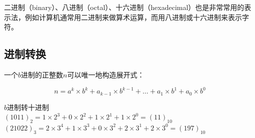 \documentclass[12pt, openany, oneside]{book}
\begin{document}
二进制（binary）、八进制（octal）、十六进制（hexadecimal）也是非常常用的表示法，例如计算机通常用二进制来做算术运算，而用八进制或十六进制来表示字符。\\

\subsection{进制转换}

一个$ b $进制的正整数$ n $可以唯一地构造展开式：

\vspace{-0.5cm}

$$
	n = a^k \times b^k + a_{k-1} \times b^{k-1} + \dots + a_1 \times b^1 + a_0 \times b^0
$$

\begin{tcolorbox}
	$ b $进制转十进制\\
	$ (1011)_2 = 1 \times 2^3 + 0 \times 2^2 + 1 \times 2^1 + 1 \times 2^0 = (11)_{10} $\\
	$ (21022)_3 = 2 \times 3^4 + 1 \times 3^3 + 0 \times 3^2 + 2 \times 3^1 + 2 \times 3^0 = (197)_{10} $
\end{tcolorbox}
\end{document}
